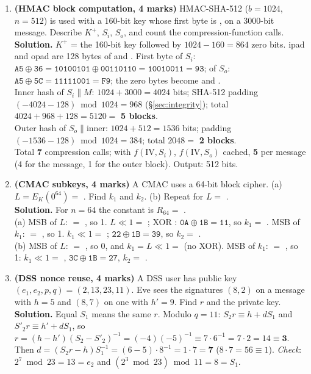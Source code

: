 \begin{enumerate}[leftmargin=1.6em,itemsep=4pt]
  \item \textbf{(HMAC block computation, 4 marks)} HMAC-SHA-512 ($b = 1024$, $n = 512$) is used with a 160-bit key whose first byte is , on a 3000-bit message. Describe $K^+$, $S_i$, $S_o$, and count the compression-function calls.\\
  \textbf{Solution.} $K^+$ = the 160-bit key followed by $1024 - 160 = 864$ zero bits. ipad and opad are 128 bytes of  and . First byte of $S_i$: $\texttt{A5} \oplus \texttt{36} = \texttt{10100101} \oplus \texttt{00110110} = \texttt{10010011} = \texttt{93}$; of $S_o$: $\texttt{A5} \oplus \texttt{5C} = \texttt{11111001} = \texttt{F9}$; the zero bytes become  and .\\
  Inner hash of $S_i \| M$: $1024 + 3000 = 4024$ bits; SHA-512 padding $(-4024 - 128) \bmod 1024 = 968$ (\S\ref{sec:integrity}); total $4024 + 968 + 128 = 5120 = $ \textbf{5 blocks}.\\
  Outer hash of $S_o \| \text{inner}$: $1024 + 512 = 1536$ bits; padding $(-1536 - 128) \bmod 1024 = 384$; total $2048 = $ \textbf{2 blocks}.\\
  Total \textbf{7} compression calls; with $f(\mathrm{IV}, S_i)$, $f(\mathrm{IV}, S_o)$ cached, \textbf{5} per message (4 for the message, 1 for the outer block). Output: 512 bits.

  \item \textbf{(CMAC subkeys, 4 marks)} A CMAC uses a 64-bit block cipher. (a) $L = E_K(0^{64}) = $ . Find $k_1$ and $k_2$. (b) Repeat for $L = $ .\\
  \textbf{Solution.} For $n = 64$ the constant is $R_{64} = $ .\\
  (a) MSB of $L$:  $=$ , so 1. $L \ll 1 = $ ; XOR : $\texttt{0A} \oplus \texttt{1B} = \texttt{11}$, so $k_1 = $ \textbf{}. MSB of $k_1$:  $=$ , so 1. $k_1 \ll 1 = $ ; $\texttt{22} \oplus \texttt{1B} = \texttt{39}$, so $k_2 = $ \textbf{}.\\
  (b) MSB of $L$:  $=$ , so 0, and $k_1 = L \ll 1 = $ \textbf{} (no XOR). MSB of $k_1$:  $=$ , so 1: $k_1 \ll 1 = $ , $\texttt{3C} \oplus \texttt{1B} = \texttt{27}$, $k_2 = $ \textbf{}.

  \item \textbf{(DSS nonce reuse, 4 marks)} A DSS user has public key $(e_1, e_2, p, q) = (2, 13, 23, 11)$. Eve sees the signatures $(8, 2)$ on a message with $h = 5$ and $(8, 7)$ on one with $h' = 9$. Find $r$ and the private key.\\
  \textbf{Solution.} Equal $S_1$ means the same $r$. Modulo $q = 11$: $S_2 r \equiv h + dS_1$ and $S'_2 r \equiv h' + dS_1$, so $r = (h - h')(S_2 - S'_2)^{-1} = (-4)(-5)^{-1} \equiv 7 \cdot 6^{-1} = 7 \cdot 2 = 14 \equiv \mathbf{3}$. Then $d = (S_2 r - h) S_1^{-1} = (6 - 5) \cdot 8^{-1} = 1 \cdot 7 = \mathbf{7}$ ($8 \cdot 7 = 56 \equiv 1$). \emph{Check}: $2^7 \bmod 23 = 13 = e_2$ and $(2^3 \bmod 23) \bmod 11 = 8 = S_1$.


\end{enumerate}
